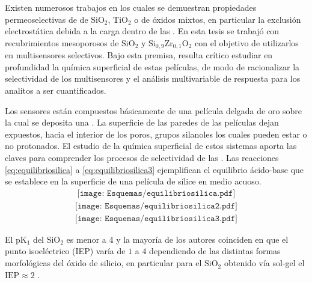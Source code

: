 	Existen numerosos trabajos en los cuales se demuestran propiedades permeoselectivas de \pdm\space de SiO$_2$, TiO$_2$ o de óxidos mixtos, en particular la exclusión electrostática debida a la carga dentro de las \pdm. \cite{walcarius2013,Andrieu-Brunsen2015,Etienne2013,Calvo2009,brunsen2011} En esta tesis se trabajó con recubrimientos mesoporosos de SiO$_2$ y Si$_{0,9}$Zr$_{0,1}$O$_2$ con el objetivo de utilizarlos en multisensores selectivos. Bajo esta premisa, resulta crítico estudiar en profundidad la química superficial de estas películas, de modo de racionalizar la selectividad de los multisensores y el análisis multivariable de respuesta para los analitos a ser cuantificados. 

	Los sensores están compuestos básicamente de una película delgada de oro sobre la cual se deposita una \pdm. La superficie de las paredes de las películas dejan expuestos, hacia el interior de los poros, grupos silanoles los cuales pueden estar o no protonados. El estudio de la química superficial de estos sistemas aporta las claves para comprender los procesos de selectividad de las \pdm.\cite{Brinker1990,Soler-Illia2011} Las reacciones \ref{eq:equilibriosilica} a \ref{eq:equilibriosilica3} ejemplifican el equilibrio ácido-base que se establece en la superficie de una película de sílice en medio acuoso.\cite{Lowe2015} 
			\begin{equation}
				\begin{aligned}
				\texttt{[image: Esquemas/equilibriosilica.pdf]}
				\label{eq:equilibriosilica}
				\end{aligned}
				\end{equation}
			\begin{equation}
				\begin{aligned}
				\texttt{[image: Esquemas/equilibriosilica2.pdf]}
				\end{aligned}
				\label{eq:equilibriosilica2}
				\end{equation}
			\begin{equation}
				\begin{aligned}
				\texttt{[image: Esquemas/equilibriosilica3.pdf]}
				\label{eq:equilibriosilica3}
				\end{aligned}
				\end{equation}		
     
     El pK$_{1}$ del $\text{SiO}_2$ es menor a 4 y la mayoría de los autores coinciden en que el punto isoeléctrico (IEP) varía de $1$ a $4$ dependiendo de  las distintas formas morfológicas del óxido de silicio, en particular para el SiO$_2$ obtenido vía sol-gel el $\text{IEP}\approx 2$ \cite{Kosmulski2002,Kosmulski2014,Schwarz1984,Si-HanWu2013}.
     
